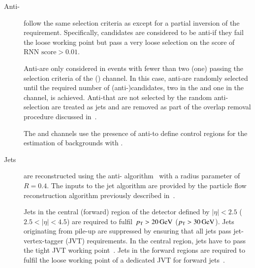 \begin{description}
\item[Anti-\tauhadvis] follow the same selection criteria as \tauhadvis except
  for a partial inversion of the \tauid requirement. Specifically, \tauhadvis
  candidates are considered to be anti-\tauhadvis if they fail the loose \tauid
  working point but pass a very loose selection on the \tauid score of
  $\text{RNN score} > 0.01$.

  Anti-\tauhadvis are only considered in events with fewer than two (one)
  \tauhadvis passing the selection criteria of the \hadhad (\lephad) channel. In
  this case, anti-\tauhadvis are randomly selected until the required number of
  (anti-)\tauhadvis candidates, two in the \hadhad and one in the \lephad
  channel, is achieved. Anti-\tauhadvis that are not selected by the random
  anti-\tauhadvis selection are treated as jets and are removed as part of the
  overlap removal procedure discussed in~.

  The \hadhad and \lephad channels use the presence of anti-\tauhadvis to define
  control regions for the estimation of backgrounds with \faketauhadvis.

\item[Jets] are reconstructed using the anti-\kt
  algorithm~\cite{Cacciari:2008gp} with a radius parameter of~$R = 0.4$. The
  inputs to the jet algorithm are provided by the particle flow reconstruction
  algorithm previously described in~.


  Jets in the central (forward) region of the detector defined by $|\eta| < 2.5$
  ($2.5 < |\eta| < 4.5$) are required to fulfil~$\pT > \SI{20}{\GeV}$
  ($\pT > \SI{30}{\GeV}$). Jets originating from pile-up are suppressed by
  ensuring that all jets pass jet-vertex-tagger (JVT) requirements. In the
  central region, jets have to pass the tight JVT working
  point~\cite{PERF-2014-03}. Jets in the forward regions
  are required to fulfil the loose working point of a dedicated JVT for forward
  jets~\cite{PERF-2016-06-witherratum,ATL-PHYS-PUB-2019-026}.


\end{description}
